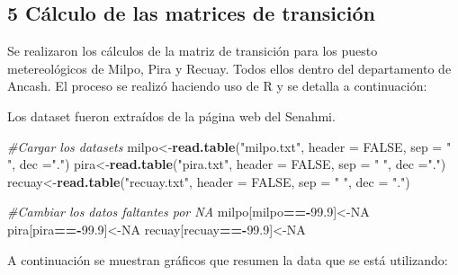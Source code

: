 \documentclass[]{article}
\title{}
\author{}
\date{}
\newenvironment{Shaded}{\begin{snugshade}}{\end{snugshade}}
\newcommand{\CommentTok}[1]{\textcolor[rgb]{0.56,0.35,0.01}{\textit{#1}}}
\newcommand{\DataTypeTok}[1]{\textcolor[rgb]{0.13,0.29,0.53}{#1}}
\newcommand{\FloatTok}[1]{\textcolor[rgb]{0.00,0.00,0.81}{#1}}
\newcommand{\KeywordTok}[1]{\textcolor[rgb]{0.13,0.29,0.53}{\textbf{#1}}}
\newcommand{\NormalTok}[1]{#1}
\newcommand{\OperatorTok}[1]{\textcolor[rgb]{0.81,0.36,0.00}{\textbf{#1}}}
\newcommand{\OtherTok}[1]{\textcolor[rgb]{0.56,0.35,0.01}{#1}}
\newcommand{\StringTok}[1]{\textcolor[rgb]{0.31,0.60,0.02}{#1}}
\begin{document}
\hypertarget{calculo-de-las-matrices-de-transicion}{%
\subsection{5 Cálculo de las matrices de
transición}\label{calculo-de-las-matrices-de-transicion}}

Se realizaron los cálculos de la matriz de transición para los puesto
metereológicos de Milpo, Pira y Recuay. Todos ellos dentro del
departamento de Ancash. El proceso se realizó haciendo uso de R y se
detalla a continuación:

Los dataset fueron extraídos de la página web del Senahmi.

\begin{Shaded}
\begin{Highlighting}[]
\CommentTok{#Cargar los datasets}
\NormalTok{milpo<-}\KeywordTok{read.table}\NormalTok{(}\StringTok{"milpo.txt"}\NormalTok{, }\DataTypeTok{header =} \OtherTok{FALSE}\NormalTok{, }\DataTypeTok{sep =} \StringTok{" "}\NormalTok{, }\DataTypeTok{dec =}\StringTok{"."}\NormalTok{)}
\NormalTok{pira<-}\KeywordTok{read.table}\NormalTok{(}\StringTok{"pira.txt"}\NormalTok{, }\DataTypeTok{header =} \OtherTok{FALSE}\NormalTok{, }\DataTypeTok{sep =} \StringTok{" "}\NormalTok{, }\DataTypeTok{dec =}\StringTok{"."}\NormalTok{)}
\NormalTok{recuay<-}\KeywordTok{read.table}\NormalTok{(}\StringTok{"recuay.txt"}\NormalTok{, }\DataTypeTok{header =} \OtherTok{FALSE}\NormalTok{, }\DataTypeTok{sep =} \StringTok{" "}\NormalTok{, }\DataTypeTok{dec =} \StringTok{"."}\NormalTok{)}
\end{Highlighting}
\end{Shaded}

\begin{Shaded}
\begin{Highlighting}[]
\CommentTok{#Cambiar los datos faltantes por NA}
\NormalTok{milpo[milpo}\OperatorTok{==-}\FloatTok{99.9}\NormalTok{]<-}\OtherTok{NA}
\NormalTok{pira[pira}\OperatorTok{==-}\FloatTok{99.9}\NormalTok{]<-}\OtherTok{NA}
\NormalTok{recuay[recuay}\OperatorTok{==-}\FloatTok{99.9}\NormalTok{]<-}\OtherTok{NA}
\end{Highlighting}
\end{Shaded}

A continuación se muestran gráficos que resumen la data que se está
utilizando:
\end{document}
